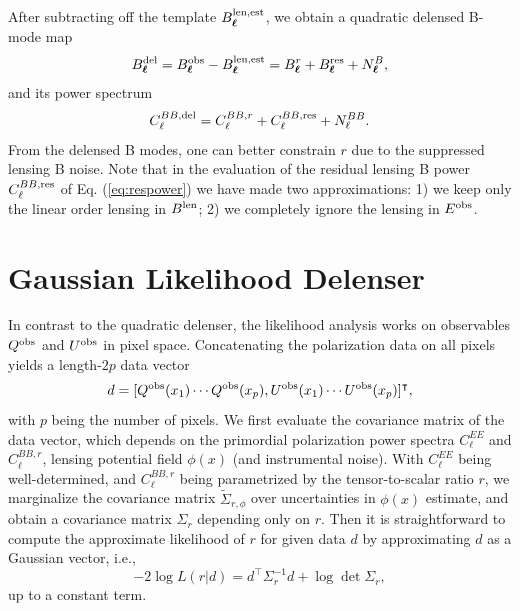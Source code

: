 \documentclass[iop,apj, numberedappendix]{emulateapj}
\def\be{\begin{equation}}
\def\ee{\end{equation}}
\newcommand*\Bell{\ensuremath{\boldsymbol\ell}}
\begin{document}
After subtracting off the template $B_{\Bell}^{\rm len, est}$, we obtain a quadratic delensed B-mode map
\be
\label{eq:bdel}
B_{\Bell}^{\rm del} = B_{\Bell}^{\rm obs} - B_{\Bell}^{\rm len, est} = B_{\Bell}^r + B_{\Bell}^{\rm res} + N_{\Bell}^B,
\ee
and its power spectrum
\be
\label{eq:delpower}
C_\ell^{BB, {\rm del}} = C_\ell^{BB,r} + C_\ell^{BB, {\rm res}} + N^{BB}_\ell.
\ee
From the delensed B modes, one can better constrain $r$ due to the suppressed lensing B noise.
Note that in the evaluation of
the residual lensing B power
$C_\ell^{BB, {\rm res}} $ of Eq. (\ref{eq:respower}) we have made two approximations:
1) we keep only the linear order lensing in $B^{\rm len}$;
2) we completely ignore the lensing in $E^{\rm obs}$.


\section{Gaussian Likelihood Delenser}
\label{sec:like}

In contrast to the quadratic delenser, the likelihood analysis works on observables
$Q^{\rm obs}$ and $U^{\rm obs}$ in pixel space.
Concatenating the polarization data on all pixels yields a length-$2p$ data vector
\be
d = [Q^{\rm obs}(x_1) \cdots Q^{\rm obs}(x_p), U^{\rm obs}(x_1) \cdots  U^{\rm obs}(x_p)]^\intercal,
\ee
with $p$ being the number of pixels.
We first evaluate the covariance matrix of the data vector,
which depends on the primordial polarization power spectra $C_\ell^{EE}$ and $C_\ell^{BB,r}$,
lensing potential field $\phi(x)$ (and instrumental noise). With $C_\ell^{EE}$ being well-determined,
and $C_\ell^{BB,r}$ being parametrized by the tensor-to-scalar ratio $r$,
we marginalize the covariance matrix $\tilde \Sigma_{r,\phi}$ over uncertainties in $\phi(x)$ estimate,
and obtain a covariance matrix $\Sigma_r$ depending only on $r$. Then it is straightforward to compute the approximate likelihood of $r$ for given data $d$
by approximating $d$ as a Gaussian vector, i.e.,
\be
\label{eq:likeli}
    -2\log L(r|d) = d^\intercal\Sigma^{-1}_r d + \log \det\Sigma_r,
\ee
up to a constant term.
\end{document}
